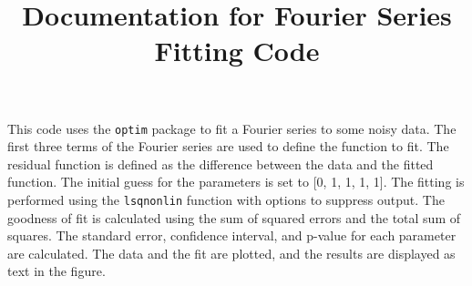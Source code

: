 \documentclass{article}
\begin{document}
\title{Documentation for Fourier Series Fitting Code}
\maketitle
This code uses the \texttt{optim} package to fit a Fourier series to some noisy data. The first three terms of the Fourier series are used to define the function to fit. The residual function is defined as the difference between the data and the fitted function. The initial guess for the parameters is set to [0, 1, 1, 1, 1]. The fitting is performed using the \texttt{lsqnonlin} function with options to suppress output. The goodness of fit is calculated using the sum of squared errors and the total sum of squares. The standard error, confidence interval, and p-value for each parameter are calculated. The data and the fit are plotted, and the results are displayed as text in the figure.
\end{document}
